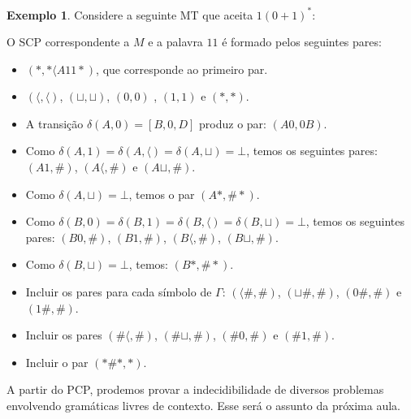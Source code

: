 \documentclass[a4paper]{article}
\theoremstyle{definition}
\newtheorem{Example}{Exemplo}
\begin{document}
    \begin{Example}
      Considere a seguinte MT que aceita $1(0+1)^*$:
      \begin{figure}[H]
        \centering
      \end{figure}
      O SCP correspondente a $M$ e a palavra $11$ é formado pelos seguintes
      pares:
      \begin{itemize}
         \item $(*,*\langle A11*)$, que corresponde ao primeiro par.
         \item $(\langle, \langle)$, $(\sqcup,\sqcup)$, $(0,0)$ , $(1,1)$ e
           $(*,*)$.
         \item A transição $\delta(A,0) = [B,0,D]$ produz o par:
           $(A0,0B)$.
         \item Como $\delta(A,1) = \delta(A,\langle) = \delta(A,\sqcup) = \bot$,
           temos os seguintes pares: $(A1,\#)$, $(A\langle, \#)$ e $(A\sqcup,\#)$.
         \item Como $\delta(A,\sqcup) = \bot$, temos o par $(A*,\#*)$.
         \item Como $\delta(B,0) = \delta(B,1) = \delta(B,\langle) =
           \delta(B,\sqcup) = \bot$, temos os seguintes pares: $(B0,\#)$,
           $(B1,\#)$, $(B\langle,\#)$, $(B\sqcup,\#)$.
         \item Como $\delta(B,\sqcup) = \bot$, temos: $(B*,\#*)$.
         \item Incluir os pares para cada símbolo de $\Gamma$: $(\langle\#,\#)$,
           $(\sqcup\#,\#)$, $(0\#,\#)$ e $(1\#,\#)$.
         \item Incluir os pares $(\#\langle,\#)$, $(\#\sqcup,\#)$, $(\#0,\#)$ e
           $(\#1,\#)$.
         \item Incluir o par $(*\# *,*)$.
      \end{itemize}
    \end{Example}

    A partir do PCP, prodemos provar a indecidibilidade de diversos problemas
    envolvendo gramáticas livres de contexto. Esse será o assunto da próxima aula.
\end{document}
